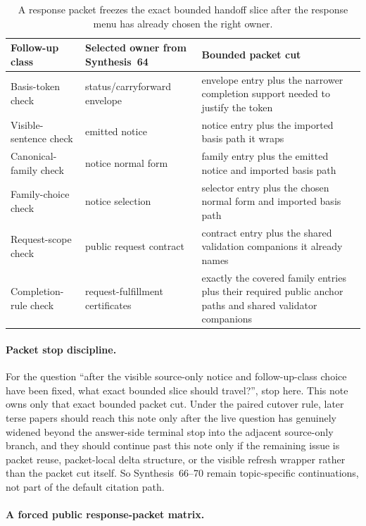 \documentclass[11pt]{article}
\begin{document}
\begin{table}[t]
\centering
\small
\begin{tabularx}{\linewidth}{@{}Y Y Y@{}}
\toprule
Follow-up class & Selected owner from Synthesis~64 & Bounded packet cut \\
\midrule
Basis-token check & status/carryforward envelope & envelope entry plus the narrower completion support needed to justify the token \\
Visible-sentence check & emitted notice & notice entry plus the imported basis path it wraps \\
Canonical-family check & notice normal form & family entry plus the emitted notice and imported basis path \\
Family-choice check & notice selection & selector entry plus the chosen normal form and imported basis path \\
Request-scope check & public request contract & contract entry plus the shared validation companions it already names \\
Completion-rule check & request-fulfillment certificates & exactly the covered family entries plus their required public anchor paths and shared validator companions \\
\bottomrule
\end{tabularx}
\caption{A response packet freezes the exact bounded handoff slice after the response menu has already chosen the right owner.}
\label{tab:publicrequestresponsepacket}
\end{table}

\paragraph{Packet stop discipline.}
For the question ``after the visible source-only notice and follow-up-class choice have been fixed, what exact bounded slice should travel?'', stop here. This note owns only that exact bounded packet cut. Under the paired cutover rule, later terse papers should reach this note only after the live question has genuinely widened beyond the answer-side terminal stop into the adjacent source-only branch, and they should continue past this note only if the remaining issue is packet reuse, packet-local delta structure, or the visible refresh wrapper rather than the packet cut itself.\cite{series:pairedterminalcutoverrules} So Synthesis~66--70 remain topic-specific continuations, not part of the default citation path.

\paragraph{A forced public response-packet matrix.}
\end{document}
